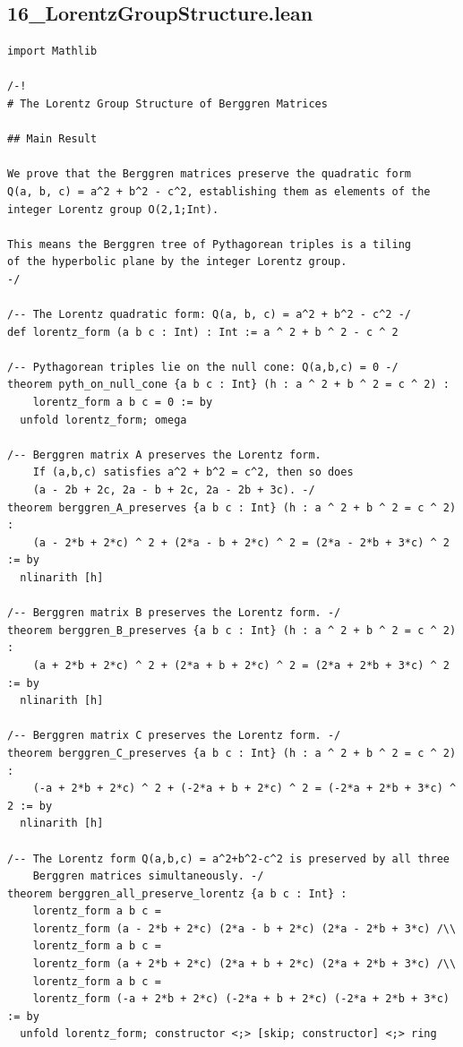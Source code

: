 \documentclass[11pt,openright,twoside]{book}
\theoremstyle{definition}
\begin{document}
\clearpage


\subsection*{16\_LorentzGroupStructure.lean}
\label{lean:16_LorentzGroupStructure}

\begin{lstlisting}[style=lean]
import Mathlib

/-!
# The Lorentz Group Structure of Berggren Matrices

## Main Result

We prove that the Berggren matrices preserve the quadratic form
Q(a, b, c) = a^2 + b^2 - c^2, establishing them as elements of the
integer Lorentz group O(2,1;Int).

This means the Berggren tree of Pythagorean triples is a tiling
of the hyperbolic plane by the integer Lorentz group.
-/

/-- The Lorentz quadratic form: Q(a, b, c) = a^2 + b^2 - c^2 -/
def lorentz_form (a b c : Int) : Int := a ^ 2 + b ^ 2 - c ^ 2

/-- Pythagorean triples lie on the null cone: Q(a,b,c) = 0 -/
theorem pyth_on_null_cone {a b c : Int} (h : a ^ 2 + b ^ 2 = c ^ 2) :
    lorentz_form a b c = 0 := by
  unfold lorentz_form; omega

/-- Berggren matrix A preserves the Lorentz form.
    If (a,b,c) satisfies a^2 + b^2 = c^2, then so does
    (a - 2b + 2c, 2a - b + 2c, 2a - 2b + 3c). -/
theorem berggren_A_preserves {a b c : Int} (h : a ^ 2 + b ^ 2 = c ^ 2) :
    (a - 2*b + 2*c) ^ 2 + (2*a - b + 2*c) ^ 2 = (2*a - 2*b + 3*c) ^ 2 := by
  nlinarith [h]

/-- Berggren matrix B preserves the Lorentz form. -/
theorem berggren_B_preserves {a b c : Int} (h : a ^ 2 + b ^ 2 = c ^ 2) :
    (a + 2*b + 2*c) ^ 2 + (2*a + b + 2*c) ^ 2 = (2*a + 2*b + 3*c) ^ 2 := by
  nlinarith [h]

/-- Berggren matrix C preserves the Lorentz form. -/
theorem berggren_C_preserves {a b c : Int} (h : a ^ 2 + b ^ 2 = c ^ 2) :
    (-a + 2*b + 2*c) ^ 2 + (-2*a + b + 2*c) ^ 2 = (-2*a + 2*b + 3*c) ^ 2 := by
  nlinarith [h]

/-- The Lorentz form Q(a,b,c) = a^2+b^2-c^2 is preserved by all three
    Berggren matrices simultaneously. -/
theorem berggren_all_preserve_lorentz {a b c : Int} :
    lorentz_form a b c =
    lorentz_form (a - 2*b + 2*c) (2*a - b + 2*c) (2*a - 2*b + 3*c) /\\
    lorentz_form a b c =
    lorentz_form (a + 2*b + 2*c) (2*a + b + 2*c) (2*a + 2*b + 3*c) /\\
    lorentz_form a b c =
    lorentz_form (-a + 2*b + 2*c) (-2*a + b + 2*c) (-2*a + 2*b + 3*c) := by
  unfold lorentz_form; constructor <;> [skip; constructor] <;> ring


\end{lstlisting}
\end{document}
